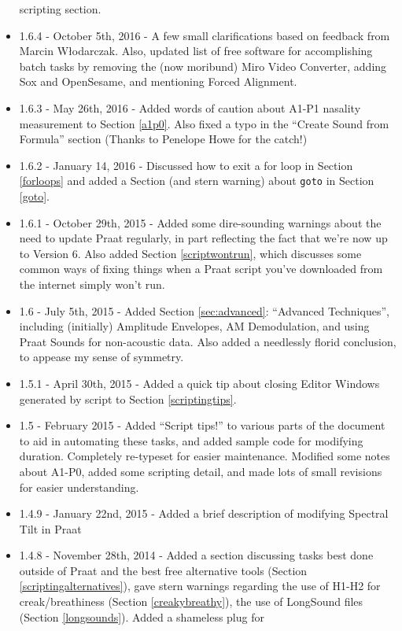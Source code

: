 \begin{itemize}
  scripting section.
\item
  1.6.4 - October 5th, 2016 - A few small clarifications based on
  feedback from Marcin Włodarczak. Also, updated list of free software
  for accomplishing batch tasks by removing the (now moribund) Miro
  Video Converter, adding Sox and OpenSesame, and mentioning Forced
  Alignment.
\item
  1.6.3 - May 26th, 2016 - Added words of caution about A1-P1 nasality
  measurement to Section \ref{a1p0}. Also fixed a typo in the ``Create
  Sound from Formula'' section (Thanks to Penelope Howe for the catch!)
\item
  1.6.2 - January 14, 2016 - Discussed how to exit a for loop in Section
  \ref{forloops} and added a Section (and stern warning) about
  \texttt{goto} in Section \ref{goto}.
\item
  1.6.1 - October 29th, 2015 - Added some dire-sounding warnings about
  the need to update Praat regularly, in part reflecting the fact that
  we're now up to Version 6. Also added Section \ref{scriptwontrun},
  which discusses some common ways of fixing things when a Praat script
  you've downloaded from the internet simply won't run.
\item
  1.6 - July 5th, 2015 - Added Section \ref{sec:advanced}: ``Advanced
  Techniques'', including (initially) Amplitude Envelopes, AM
  Demodulation, and using Praat Sounds for non-acoustic data. Also added
  a needlessly florid conclusion, to appease my sense of symmetry.
\item
  1.5.1 - April 30th, 2015 - Added a quick tip about closing Editor
  Windows generated by script to Section \ref{scriptingtips}.
\item
  1.5 - February 2015 - Added ``Script tips!'' to various parts of the
  document to aid in automating these tasks, and added sample code for
  modifying duration. Completely re-typeset for easier maintenance.
  Modified some notes about A1-P0, added some scripting detail, and made
  lots of small revisions for easier understanding.
\item
  1.4.9 - January 22nd, 2015 - Added a brief description of modifying
  Spectral Tilt in Praat
\item
  1.4.8 - November 28th, 2014 - Added a section discussing tasks best
  done outside of Praat and the best free alternative tools (Section
  \ref{scriptingalternatives}), gave stern warnings regarding the use of
  H1-H2 for creak/breathiness (Section \ref{creakybreathy}), the use of
  LongSound files (Section \ref{longsounds}). Added a shameless plug for

\end{itemize}
